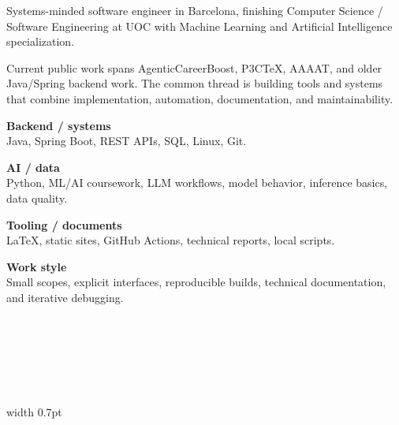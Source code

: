 \documentclass[a4paper,10pt]{article}
\begin{document}
  \cvheader

  \begin{minipage}[t][\BodyHeight]{\RailWidth}
    \scriptsize

    Systems-minded software engineer in Barcelona, finishing Computer Science /
    Software Engineering at UOC with Machine Learning and Artificial
    Intelligence specialization.

    Current public work spans AgenticCareerBoost, P3CTeX, AAAAT, and older
    Java/Spring backend work. The common thread is building tools and systems
    that combine implementation, automation, documentation, and maintainability.

    \cvBeforeEngineering

    \textbf{Backend / systems}\\
    Java, Spring Boot, REST APIs, SQL, Linux, Git.

    \vspace{0.20em}
    \textbf{AI / data}\\
    Python, ML/AI coursework, LLM workflows, model behavior, inference basics,
    data quality.

    \vspace{0.20em}
    \textbf{Tooling / documents}\\
    \LaTeX, static sites, GitHub Actions, technical reports, local scripts.

    \vspace{0.20em}
    \textbf{Work style}\\
    Small scopes, explicit interfaces, reproducible builds, technical
    documentation, and iterative debugging.

    \begin{center}
      \\[0.32em]
      \\[0.32em]
      \\[0.32em]
      \\[0.32em]
      \\[0.32em]
    \end{center}

    \vspace*{\fill}
    \cvMainLinks
  \end{minipage}
  \hfill
  {\color{line}\vrule width 0.7pt}
\end{document}
